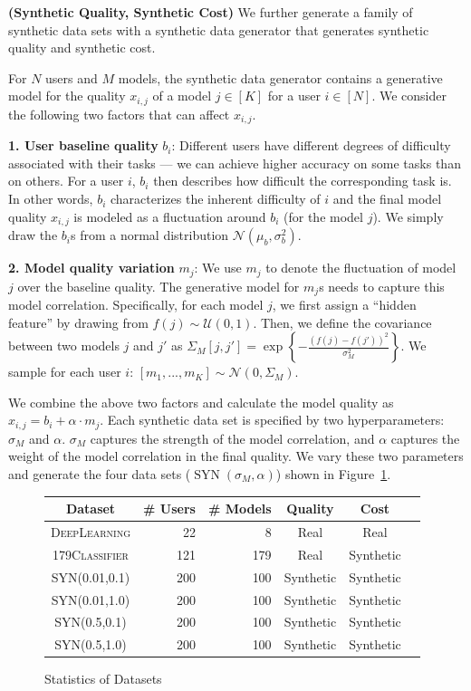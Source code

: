 \documentclass[letterpaper]{vldb}
\DeclareMathOperator{\SYN}{SYN}
\begin{document}
\vspace{0.5em}
\noindent
{\bf (Synthetic Quality, Synthetic Cost)}
We further generate a family of 
synthetic data sets with a 
synthetic data generator that generates
synthetic quality and synthetic cost.

For $N$ users and $M$ models, the synthetic
data generator contains a generative model 
for the quality $x_{i,j}$ of a 
model $j\in[K]$ for a user $i\in[N]$.
We consider the following two factors that can affect $x_{i,j}$.

\noindent
{\bf 1. User baseline quality} $b_i$: Different 
users have different degrees of difficulty associated with their tasks --- we can achieve higher accuracy on some tasks than on others.
For a user $i$, $b_i$ then describes how difficult the corresponding task is.
In other words, $b_i$ characterizes the inherent difficulty of $i$ and the final model quality $x_{i,j}$ is modeled as a fluctuation around $b_i$ (for the model $j$). We simply draw the $b_i$s from a normal distribution $\mathcal{N}(\mu_b,\sigma_b^2)$.


\noindent
{\bf 2. Model quality variation} $m_j$: 
We use $m_j$ to denote the fluctuation of model $j$
over the baseline quality. The generative model for 
$m_j$s needs to capture this model correlation.
Specifically, for each model $j$, we first assign a 
``hidden feature'' by drawing
from $f(j)\sim\mathcal{U}(0,1)$.
Then, we define the covariance between 
two models $j$ and $j'$ as 
$\Sigma_M[j, j']=\exp \left\{-\frac{(f(j) - f(j'))^2}{\sigma_M^2} \right\}$. We sample
for each user $i$: $
[m_1,...,m_K] \sim \mathcal{N}(0, \Sigma_M)$.

We combine the above two factors and 
calculate the model quality as $x_{i,j} = b_i + \alpha\cdot m_j$. Each synthetic data
set is specified by two hyperparameters:
$\sigma_M$ and $\alpha$. $\sigma_M$ captures
the strength of the model correlation, and $\alpha$
captures the weight of the model correlation in
the final quality. We vary these two
parameters and generate the four data sets
($\SYN(\sigma_M, \alpha)$) shown in Figure~\ref{tab:datasets}.


\begin{figure}
\centering
\small
\begin{tabular}{c | r r | c c c}
\hline
{\bf Dataset} & {\bf \# Users} & {\bf \# Models} & {\bf Quality} & {\bf Cost} \\
\hline
\textsc{DeepLearning} & 22 & 8 & Real & Real \\
\textsc{179Classifier} & 121 & 179 & Real & Synthetic \\
\hline
\textsc{SYN(0.01,0.1)} & 200 & 100 & Synthetic & Synthetic \\
\textsc{SYN(0.01,1.0)} & 200 & 100 & Synthetic & Synthetic \\
\textsc{SYN(0.5,0.1)} & 200 & 100 & Synthetic & Synthetic \\
\textsc{SYN(0.5,1.0)} & 200 & 100 & Synthetic & Synthetic \\
\hline
\end{tabular}
\vspace{-1em}
\caption{Statistics of Datasets}
\label{tab:datasets}
\vspace{-1em}
\end{figure}
\end{document}
